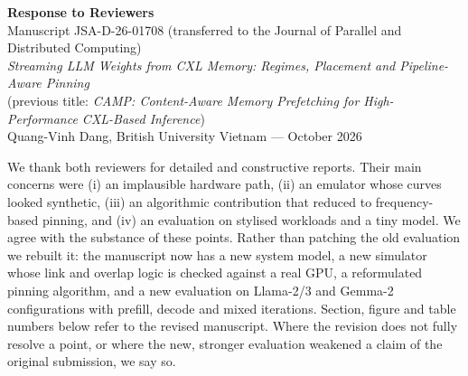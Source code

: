 \documentclass[11pt]{article}
\begin{document}
\begin{center}
{\Large\bfseries Response to Reviewers}\\[4pt]
Manuscript JSA-D-26-01708 (transferred to the Journal of Parallel and Distributed Computing)\\
\textit{Streaming LLM Weights from CXL Memory: Regimes, Placement and Pipeline-Aware Pinning}\\
(previous title: \textit{CAMP: Content-Aware Memory Prefetching for High-Performance CXL-Based Inference})\\[2pt]
Quang-Vinh Dang, British University Vietnam --- October 2026
\end{center}

We thank both reviewers for detailed and constructive reports. Their main concerns were (i) an implausible hardware path, (ii) an emulator whose curves looked synthetic, (iii) an algorithmic contribution that reduced to frequency-based pinning, and (iv) an evaluation on stylised workloads and a tiny model. We agree with the substance of these points. Rather than patching the old evaluation we rebuilt it: the manuscript now has a new system model, a new simulator whose link and overlap logic is checked against a real GPU, a reformulated pinning algorithm, and a new evaluation on Llama-2/3 and Gemma-2 configurations with prefill, decode and mixed iterations. Section, figure and table numbers below refer to the revised manuscript. Where the revision does not fully resolve a point, or where the new, stronger evaluation weakened a claim of the original submission, we say so.
\end{document}
